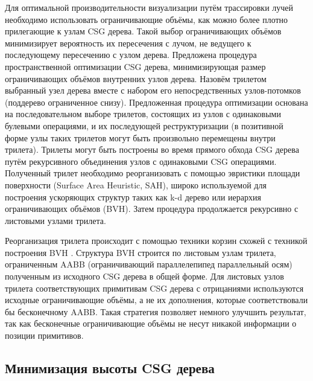 Для оптимальной производительности визуализации путём трассировки лучей необходимо использовать ограничивающие объёмы, как можно более плотно прилегающие к узлам CSG дерева. Такой выбор ограничивающих объёмов минимизирует вероятность их пересечения с лучом, не ведущего к последующему пересечению с узлом дерева. Предложена процедура пространственной оптимизации CSG дерева, минимизирующая размер ограничивающих объёмов внутренних узлов дерева. Назовём трилетом выбранный узел дерева вместе с набором его непосредственных узлов-потомков (поддерево ограниченное снизу). Предложенная процедура оптимизации основана на последовательном выборе трилетов, состоящих из узлов с одинаковыми булевыми операциями,  и их последующей реструктуризации (в позитивной форме узлы таких трилетов могут быть произвольно перемещены внутри трилета). Трилеты могут быть построены во время прямого обхода CSG дерева путём рекурсивного объединения узлов с одинаковыми CSG операциями. Полученный трилет необходимо реорганизовать с помощью эвристики площади поверхности (Surface Area Heuristic, SAH), широко используемой для построения ускоряющих структур таких как k-d дерево или иерархия ограничивающих объёмов (BVH). Затем процедура продолжается рекурсивно с листовыми узлами трилета.

Реорганизация трилета происходит с помощью техники корзин схожей с техникой построения BVH \cite{wald2007fast}. Структура BVH строится по листовым узлам трилета, ограниченным AABB (ограничивающий параллелепипед параллельный осям) полученным из исходного CSG дерева в общей форме. Для листовых узлов трилета соответствующих примитивам CSG дерева с отрицаниями используются исходные ограничивающие объёмы, а не их дополнения, которые соответствовали бы бесконечному AABB. Такая стратегия позволяет немного улучшить результат, так как бесконечные ограничивающие объёмы не несут никакой информации о позиции примитивов.

\subsection{Минимизация высоты CSG дерева} \label{sect2_height_minimization}

